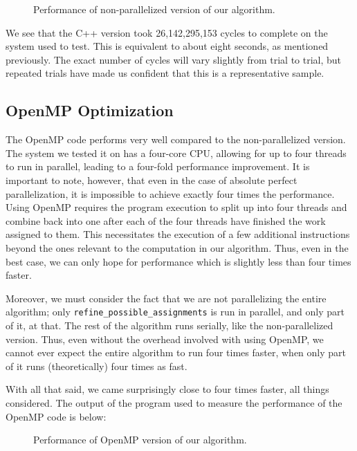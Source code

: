\documentclass{article}
\begin{document}
  \setcounter{figure}{0}
  \begin{figure}[H]
    \centering
    
    \caption{Performance of non-parallelized version of our algorithm.}
    \label{ls:cperf}
  \end{figure}

  We see that the C++ version took 26,142,295,153 cycles to complete on the system used to test. This is equivalent to about eight seconds, as mentioned previously. The exact number of cycles will vary slightly from trial to trial, but repeated trials have made us confident that this is a representative sample.

  \subsection{OpenMP Optimization}
  The OpenMP code performs very well compared to the non-parallelized version. The system we tested it on has a four-core CPU, allowing for up to four threads to run in parallel, leading to a four-fold performance improvement. It is important to note, however, that even in the case of absolute perfect parallelization, it is impossible to achieve exactly four times the performance. Using OpenMP requires the program execution to split up into four threads and combine back into one after each of the four threads have finished the work assigned to them. This necessitates the execution of a few additional instructions beyond the ones relevant to the computation in our algorithm. Thus, even in the best case, we can only hope for performance which is slightly less than four times faster.

  Moreover, we must consider the fact that we are not parallelizing the entire algorithm; only \texttt{refine\_possible\_assignments} is run in parallel, and only part of it, at that. The rest of the algorithm runs serially, like the non-parallelized version. Thus, even without the overhead involved with using OpenMP, we cannot ever expect the entire algorithm to run four times faster, when only part of it runs (theoretically) four times as fast. 

  With all that said, we came surprisingly close to four times faster, all things considered. The output of the program used to measure the performance of the OpenMP code is below:

  \setcounter{figure}{0}
  \begin{figure}[H]
    \centering
    
    \caption{Performance of OpenMP version of our algorithm.}
    \label{ls:ompperf}
  \end{figure}
\end{document}
